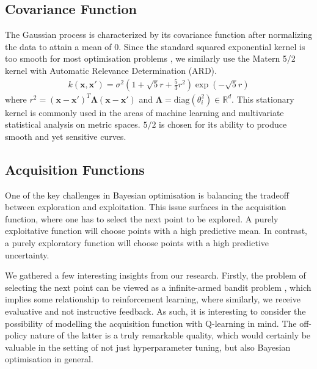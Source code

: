 \documentclass[letterpaper]{article}
\begin{document}
\subsection{Covariance Function}
The Gaussian process is characterized by its covariance function after normalizing the 
data to attain a mean of 0. Since the standard squared exponential kernel is too
smooth for most optimisation problems \cite{snoek2012practical}, we similarly
use the Matern 5/2 kernel with Automatic Relevance Determination (ARD).
\begin{align*}
k (\textbf{x},\textbf{x}') = \sigma^2(1+\sqrt5r+\frac{5}{3}r^2)\exp(-\sqrt5r)
\end{align*}
\noindent where $r^2 = (\textbf{x}-\textbf{x}')^T\boldsymbol{\Lambda}(\textbf{x}-\textbf{x}')$
and $\boldsymbol{\Lambda} = \text{diag}(\theta_i^2) \in \mathbb{R}^d$.
This stationary kernel is commonly used in the areas of machine learning and 
multivariate statistical analysis on metric spaces. $5/2$ is chosen for its ability to 
produce smooth and yet sensitive curves.

\subsection{Acquisition Functions}
One of the key challenges in Bayesian optimisation is balancing the tradeoff
between exploration and exploitation. This issue surfaces in the acquisition function,
where one has to select the next point to be explored. A purely exploitative function
will choose points with a high predictive mean. In contrast, a purely exploratory
function will choose points with a high predictive uncertainty.

We gathered a few interesting insights from our research.
Firstly, the problem of selecting the next point can be viewed as a infinite-armed
bandit problem \cite{hoffman2011portfolio}, which implies some relationship to
reinforcement learning, where similarly, we receive evaluative and not instructive
feedback. As such, it is interesting to consider the possibility of modelling the
acquisition function with Q-learning in mind. The off-policy nature of the latter is
a truly remarkable quality, which would certainly be valuable in the setting of not
just hyperparameter tuning, but also Bayesian optimisation in general.
\end{document}
